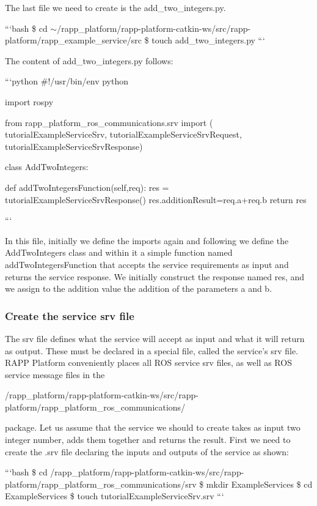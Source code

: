 The last file we need to create is the {\ttfamily add\-\_\-two\-\_\-integers.\-py}.

```bash \$ cd $\sim$/rapp\-\_\-platform/rapp-\/platform-\/catkin-\/ws/src/rapp-\/platform/rapp\-\_\-example\-\_\-service/src \$ touch add\-\_\-two\-\_\-integers.\-py ```

The content of {\ttfamily add\-\_\-two\-\_\-integers.\-py} follows\-:

```python \#!/usr/bin/env python

import rospy

from rapp\-\_\-platform\-\_\-ros\-\_\-communications.\-srv import ( tutorial\-Example\-Service\-Srv, tutorial\-Example\-Service\-Srv\-Request, tutorial\-Example\-Service\-Srv\-Response)

class Add\-Two\-Integers\-: \begin{DoxyVerb}def addTwoIntegersFunction(self,req):
    res = tutorialExampleServiceSrvResponse()
    res.additionResult=req.a+req.b
    return res
\end{DoxyVerb}
 ```

In this file, initially we define the imports again and following we define the Add\-Two\-Integers class and within it a simple function named add\-Two\-Integers\-Function that accepts the service requirements as input and returns the service response. We initially construct the response named res, and we assign to the addition value the addition of the parameters a and b.

\subsubsection*{Create the service srv file}

The srv file defines what the service will accept as input and what it will return as output. These must be declared in a special file, called the service's srv file. R\-A\-P\-P Platform conveniently places all R\-O\-S service srv files, as well as R\-O\-S service message files in the \begin{DoxyVerb}/rapp_platform/rapp-platform-catkin-ws/src/rapp-platform/rapp_platform_ros_communications/
\end{DoxyVerb}


package. Let us assume that the service we should to create takes as input two integer number, adds them together and returns the result. First we need to create the .srv file declaring the inputs and outputs of the service as shown\-:

```bash \$ cd /rapp\-\_\-platform/rapp-\/platform-\/catkin-\/ws/src/rapp-\/platform/rapp\-\_\-platform\-\_\-ros\-\_\-communications/srv \$ mkdir Example\-Services \$ cd Example\-Services \$ touch tutorial\-Example\-Service\-Srv.\-srv ```

